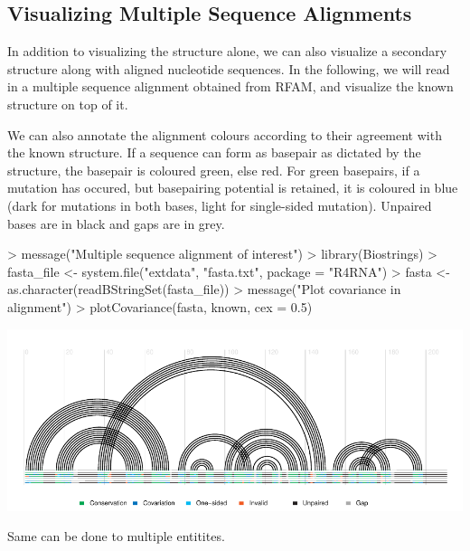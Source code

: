 \documentclass[letterpaper]{article}
\begin{document}
\subsection{Visualizing Multiple Sequence Alignments}

In addition to visualizing the structure alone, we can also visualize a
secondary structure along with aligned nucleotide sequences.  In the following,
we will read in a multiple sequence alignment obtained from RFAM, and visualize
the known structure on top of it.

We can also annotate the alignment colours according to their agreement with the
known structure.  If a sequence can form as basepair as dictated by the structure,
the basepair is coloured green, else red.  For green basepairs, if a mutation
has occured, but basepairing potential is retained, it is coloured in blue
(dark for mutations in both bases, light for single-sided mutation).  Unpaired
bases are in black and gaps are in grey.

\begin{Schunk}
\begin{Sinput}
> message("Multiple sequence alignment of interest")
> library(Biostrings)
> fasta_file <- system.file("extdata", "fasta.txt", package = "R4RNA")
> fasta <- as.character(readBStringSet(fasta_file))
> message("Plot covariance in alignment")
> plotCovariance(fasta, known, cex = 0.5)
\end{Sinput}
\end{Schunk}
\includegraphics{R4RNA-016}

Same can be done to multiple entitites.
\end{document}
